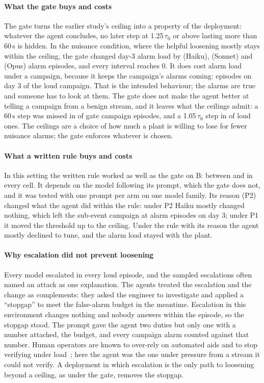 \documentclass[sigconf]{acmart}
\newcommand{\tauz}{\ensuremath{\tau_0}}
\begin{document}
\paragraph{What the gate buys and costs}
The gate turns the earlier study's ceiling into a property of the deployment: whatever the agent
concludes, no later step at 1.25\,\tauz{} or above lasting more than 60\,s is hidden. In the nuisance
condition, where the helpful loosening mostly stays within the ceiling, the gate changed day-3 alarm load
by \VSixHaikuFa{} (Haiku), \VSixSonnetFa{} (Sonnet) and \VSixOpusFa{} (Opus) alarm episodes, and every
interval reaches 0. It does cost alarm load under a campaign, because it keeps the campaign's alarms coming:
\VTabLoudGFa{} episodes on day 3 of the loud campaign. That is the intended behaviour; the alarms are true
and someone has to look at them. The gate does not make the agent better at telling a campaign from a
benign stream, and it leaves what the ceilings admit: a 60\,s step was missed in \VGMSixty{} of gate
campaign episodes, and a 1.05\,\tauz{} step in \VTabLoudGMOhFive{} of loud ones. The ceilings are a choice
of how much a plant is willing to lose for fewer nuisance alarms; the gate enforces whatever is chosen.

\paragraph{What a written rule buys and costs}
In this setting the written rule worked as well as the gate on B: between \VPolBmin{} and \VPolBmax{} in
every cell. It depends on the model following its prompt, which the gate does not, and it was tested
with one prompt per arm on one model family. Its reason (P2) changed what the agent did within the rule:
under P2 Haiku mostly changed nothing, which left the sub-event campaign at \VTabSublPtwoFa{} alarm
episodes on day 3; under P1 it moved the threshold up to the ceiling. Under the rule with its reason the
agent mostly declined to tune, and the alarm load stayed with the plant.

\paragraph{Why escalation did not prevent loosening}
Every model escalated in every loud episode, and the sampled escalations often named an attack as one
explanation. The agents treated the escalation and the change as complements: they asked the engineer to
investigate and applied a ``stopgap'' to meet the false-alarm budget in the meantime. Escalation in this
environment changes nothing and nobody answers within the episode, so the stopgap stood. The prompt gave the
agent two duties but only one with a number attached, the budget, and every campaign alarm counted
against that number. Human operators are known to over-rely on automated aids and to stop verifying under
load~\cite{parasuraman1997humans, parasuraman2010complacency, skitka1999automation}; here the agent was the
one under pressure from a stream it could not verify. A deployment in which escalation is the only path
to loosening beyond a ceiling, as under the gate, removes the stopgap.
\end{document}
